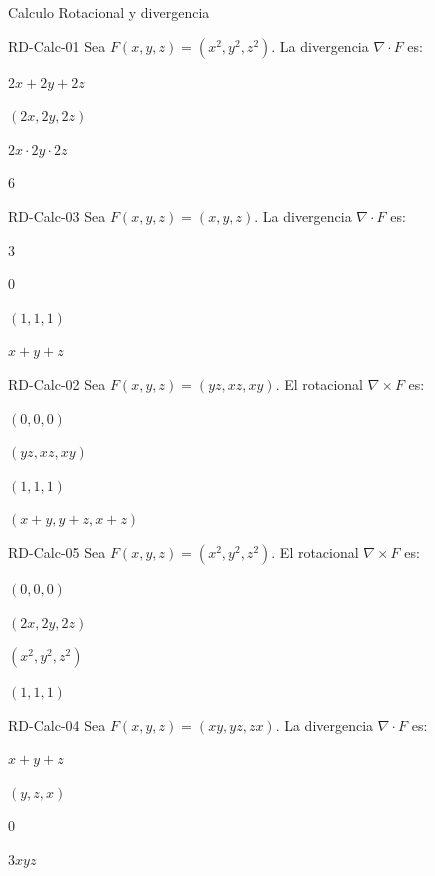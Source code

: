 \documentclass[a4,11pt]{aleph-notas}
\begin{document}
\begin{quiz}{Calculo Rotacional y divergencia}

\begin{multi}[]%
    {RD-Calc-01}
    Sea $F(x,y,z) = (x^2, y^2, z^2)$. La divergencia $\nabla \cdot F$ es:
    \item* $2x + 2y + 2z$
    \item $(2x, 2y, 2z)$
    \item $2x \cdot 2y \cdot 2z$
    \item $6$
\end{multi}

\begin{multi}[]%
    {RD-Calc-03}
    Sea $F(x,y,z) = (x, y, z)$. La divergencia $\nabla \cdot F$ es:
    \item* $3$
    \item $0$
    \item $(1,1,1)$
    \item $x+y+z$
\end{multi}

\begin{multi}[]%
    {RD-Calc-02}
    Sea $F(x,y,z) = (yz, xz, xy)$. El rotacional $\nabla \times F$ es:
    \item* $(0, 0, 0)$
    \item $(yz, xz, xy)$
    \item $(1, 1, 1)$
    \item $(x+y, y+z, x+z)$
\end{multi}

\begin{multi}[]%
    {RD-Calc-05}
    Sea $F(x,y,z) = (x^2, y^2, z^2)$. El rotacional $\nabla \times F$ es:
    \item* $(0, 0, 0)$
    \item $(2x, 2y, 2z)$
    \item $(x^2, y^2, z^2)$
    \item $(1, 1, 1)$
\end{multi}

\begin{multi}[]%
    {RD-Calc-04}
    Sea $F(x,y,z) = (xy, yz, zx)$. La divergencia $\nabla \cdot F$ es:
    \item* $x + y + z$
    \item $(y, z, x)$
    \item $0$
    \item $3xyz$
\end{multi}


\end{quiz}
\end{document}
